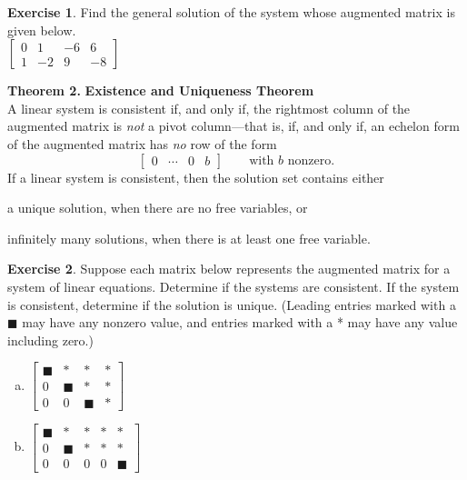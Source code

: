 \documentclass[10pt]{book}
\newcommand{\boxcolor}{gray!30}
\newenvironment{boxthm}{\begin{mdframed}[backgroundcolor=\boxcolor,nobreak=true]}{\end{mdframed}}
\theoremstyle{definition}
\newtheorem{exercise}{Exercise}[section]
\begin{document}
\begin{exercise} %
Find the general solution of the system whose augmented matrix is given below. \\

$\begin{bmatrix}
0 &  1 & -6 &  6 \\
1 & -2 &  9 & -8
\end{bmatrix}$
\end{exercise}
\vfill


\newpage


\begin{boxthm}
\textbf{Theorem 2.}
\textbf{Existence and Uniqueness Theorem} \\
A linear system is consistent if, and only if, the rightmost column of the augmented matrix is \textit{not} a pivot column---that is, if, and only if, an echelon form of the augmented matrix has \textit{no} row of the form
$$ \begin{bmatrix}0 & \cdots & 0 & b\end{bmatrix} \qquad \text{with $b$ nonzero}.$$
If a linear system is consistent, then the solution set contains either 
\begin{enumerate*}[(i)]
	\item a unique solution, when there are no free variables, or
	\item infinitely many solutions, when there is at least one free variable.
\end{enumerate*}
\end{boxthm}


\begin{exercise} %
Suppose each matrix below represents the augmented matrix for a system of linear equations. Determine if the systems are consistent. If the system is consistent, determine if the solution is unique. (Leading entries marked with a $\blacksquare$ may have any nonzero value, and entries marked with a * may have any value including zero.)
\begin{multicols}{2}
	\begin{enumerate}[(a)]
		\item
				$\begin{bmatrix}
				\blacksquare	& *				& *				& * \\ 
				0				& \blacksquare	& *				& * \\ 
				0				& 0				& \blacksquare	& *
				\end{bmatrix}$
		\item	
				$\begin{bmatrix}
				\blacksquare	& *				& *	& * & * \\ 
				0				& \blacksquare	& *	& * & * \\ 
				0				& 0				& 0	& 0 & \blacksquare
				\end{bmatrix}$
	\end{enumerate}
\end{multicols}
\end{exercise}
\vfill
\end{document}
